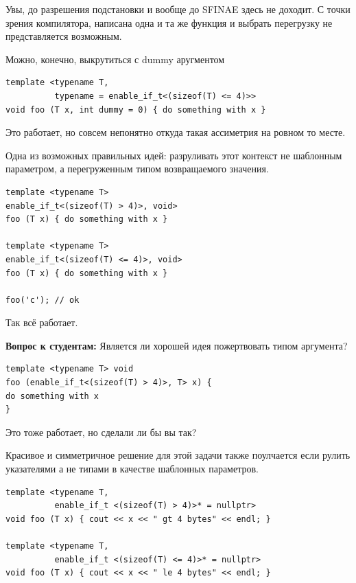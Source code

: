 \documentclass[a4paper,12pt,oneside]{book}
\newif\ifanswers
\begin{document}
Увы, до разрешения подстановки и вообще до SFINAE здесь не доходит. С точки зрения компилятора, написана одна и та же функция и выбрать перегрузку не представляется возможным.

Можно, конечно, выкрутиться с dummy аругментом

\begin{lstlisting}
template <typename T, 
          typename = enable_if_t<(sizeof(T) <= 4)>>
void foo (T x, int dummy = 0) { do something with x }
\end{lstlisting}

Это работает, но совсем непонятно откуда такая ассиметрия на ровном то месте.

Одна из возможных правильных идей: разруливать этот контекст не шаблонным параметром, а перегруженным типом возвращаемого значения.

\begin{lstlisting}
template <typename T>
enable_if_t<(sizeof(T) > 4)>, void> 
foo (T x) { do something with x }

template <typename T>
enable_if_t<(sizeof(T) <= 4)>, void> 
foo (T x) { do something with x }

foo('c'); // ok
\end{lstlisting}

Так всё работает.

\textbf{Вопрос к студентам:} Является ли хорошей идея пожертвовать типом аргумента?

\begin{lstlisting}
template <typename T> void 
foo (enable_if_t<(sizeof(T) > 4)>, T> x) { 
do something with x 
}
\end{lstlisting}

Это тоже работает, но сделали ли бы вы так?

\ifanswers
Правильный ответ: с моей точки зрения это крайне плохая идея, так как она убивает вывод типов.
\fi

Красивое и симметричное решение для этой задачи также поулчается если рулить указателями а не типами в качестве шаблонных параметров.

\begin{lstlisting}
template <typename T,
          enable_if_t <(sizeof(T) > 4)>* = nullptr>
void foo (T x) { cout << x << " gt 4 bytes" << endl; }

template <typename T,
          enable_if_t <(sizeof(T) <= 4)>* = nullptr>
void foo (T x) { cout << x << " le 4 bytes" << endl; }
\end{lstlisting}
\end{document}

